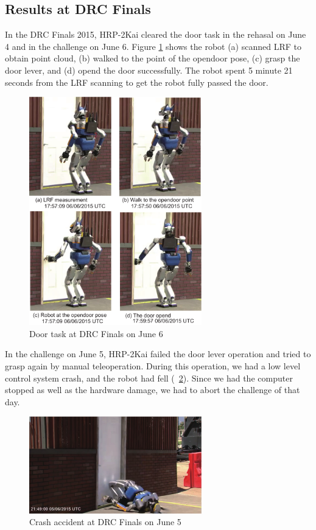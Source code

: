 
\subsection{Results at DRC Finals}
%
In the DRC Finals 2015, HRP-2Kai cleared the door task in the rehasal on June 4 and in
the challenge on June 6. Figure \ref{fig:drc_door_aist_day2} shows the robot (a) scanned LRF 
to obtain point cloud, (b) walked to the point of the opendoor pose, (c) grasp the door lever, and (d)
 opend the door successfully. The robot spent 5 minute 21 seconds from the LRF scanning to get the 
robot fully passed the door.
%
\begin{figure}[t]
  \centering
  \includegraphics[width = 7.5cm]{img/drc_door_aist_day2}
  \caption{Door task at DRC Finals on June 6}
  \label{fig:drc_door_aist_day2}
\end{figure}

In the challenge on June 5, HRP-2Kai failed the door lever operation and tried to
grasp again by manual teleoperation. During this operation, we had a low level control system crash, 
and the robot had fell (\figurename~\ref{fig:drc_door_aist_day1}).
Since we had the computer stopped as well as the hardware damage, we had to abort the challenge of that day. 
%
\begin{figure}[t]
  \centering
  \includegraphics[width = 7.5cm]{img/drc_door_aist_day1}
  \caption{Crash accident at DRC Finals on June 5}
  \label{fig:drc_door_aist_day1}
\end{figure}

